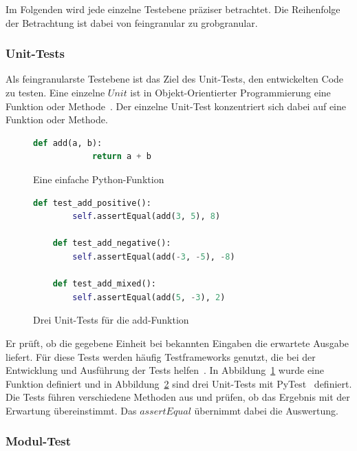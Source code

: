 Im Folgenden wird jede einzelne Testebene präziser betrachtet.
Die Reihenfolge der Betrachtung ist dabei von feingranular zu grobgranular.

\subsubsection{Unit-Tests}

Als feingranularste Testebene ist das Ziel des Unit-Tests, den entwickelten Code zu testen.
Eine einzelne $Unit$ ist in Objekt-Orientierter Programmierung eine Funktion oder Methode~\cite[vgl. Unit Testing]{software-testing-craftmans}.
Der einzelne Unit-Test konzentriert sich dabei auf eine Funktion oder Methode.

\begin{figure}[h!]
    \begin{lstlisting}[language=Python]
        def add(a, b):
            return a + b
    \end{lstlisting}
    \caption{Eine einfache Python-Funktion}
    \label{unitfkt}
\end{figure}

\begin{figure}[h!]
    \begin{lstlisting}[language=Python]
    def test_add_positive():
        self.assertEqual(add(3, 5), 8)

    def test_add_negative():
        self.assertEqual(add(-3, -5), -8)

    def test_add_mixed():
        self.assertEqual(add(5, -3), 2)
    \end{lstlisting}
    \caption{Drei Unit-Tests für die add-Funktion}
    \label{unitfkttest}
\end{figure}

Er prüft, ob die gegebene Einheit bei bekannten Eingaben die erwartete Ausgabe liefert.
Für diese Tests werden häufig Testframeworks genutzt, die bei der Entwicklung und Ausführung der Tests helfen~\cite{software-testing}.
In Abbildung~\ref{unitfkt} wurde eine Funktion definiert und in Abbildung~\ref{unitfkttest} sind drei Unit-Tests mit PyTest~\cite{pytest} definiert.
Die Tests führen verschiedene Methoden aus und prüfen, ob das Ergebnis mit der Erwartung übereinstimmt.
Das $assertEqual$ übernimmt dabei die Auswertung.

\subsubsection{Modul-Test}

